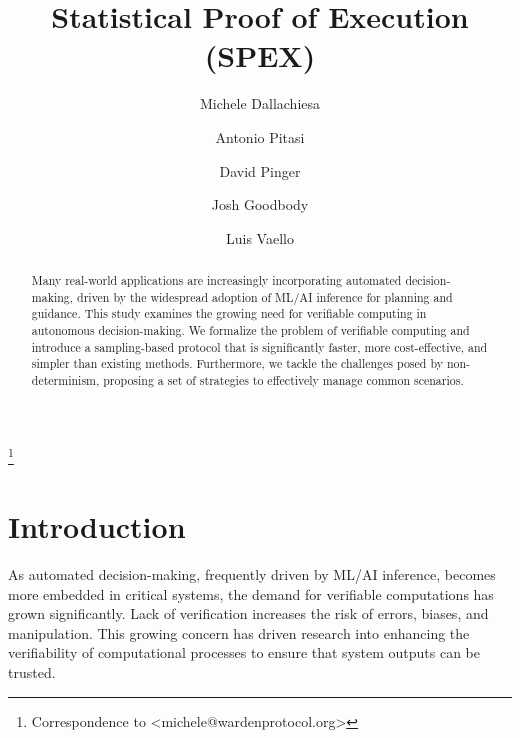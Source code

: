 \documentclass[sigconf, nonacm]{acmart}
\begin{document}
\title{Statistical Proof of Execution (SPEX)}

\newcommand{\sym}[1] {\textit{\textbf{#1}}}

\newtheorem{texample}{Example}[section]
\newtheorem{problem}{Problem}[section]

\author{Michele Dallachiesa}

\author{Antonio Pitasi}

\author{David Pinger}

\author{Josh Goodbody}

\author{Luis Vaello}

\begin{abstract}
  Many real-world applications are increasingly incorporating automated decision-making, driven by the widespread adoption of ML/AI inference for planning and guidance. This study examines the growing need for verifiable computing in autonomous decision-making. We formalize the problem of verifiable computing and introduce a sampling-based protocol that is significantly faster, more cost-effective, and simpler than existing methods. Furthermore, we tackle the challenges posed by non-determinism, proposing a set of strategies to effectively manage common scenarios.
\end{abstract}

\maketitle

{\let\thefootnote\relax\footnote{{Correspondence to <michele@wardenprotocol.org>}}}

\section{Introduction}

As automated decision-making, frequently driven by ML/AI inference, becomes more embedded in critical systems, the demand for verifiable computations has grown significantly.
Lack of verification increases the risk of errors, biases, and manipulation.
This growing concern has driven research into enhancing the verifiability of computational processes to ensure that system outputs can be trusted.
\end{document}
